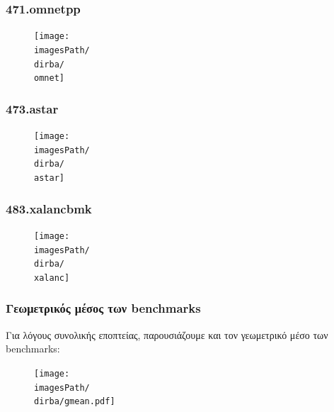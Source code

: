 \documentclass[12pt,a4paper]{article}
\newcommand{\imagesPath}{/home/nick/arch-ntua/ex02/graphs}
\newcommand{\omnet}{471.omnetpp.cslab_branch_predictors.out.pdf}
\newcommand{\astar}{473.astar.cslab_branch_predictors.out.pdf}
\newcommand{\xalanc}{483.xalancbmk.cslab_branch_predictors.out.pdf}
\newcommand{\dirba}{4.2/i}
\begin{document}
				\subsubsection{471.omnetpp}
					\begin{figure}[H]
						\begin{center}
							 \texttt{[image: \\imagesPath/\\dirba/\\omnet]}
						\end{center}
					\end{figure}

				\subsubsection{473.astar}
					\begin{figure}[H]
						\begin{center}
							 \texttt{[image: \\imagesPath/\\dirba/\\astar]}
						\end{center}
					\end{figure}

				\subsubsection{483.xalancbmk}
					\begin{figure}[H]
						\begin{center}
							 \texttt{[image: \\imagesPath/\\dirba/\\xalanc]}
						\end{center}
					\end{figure} 
				
				
				\subsubsection{Γεωμετρικός μέσος των benchmarks}
				
					Για λόγους συνολικής εποπτείας, παρουσιάζουμε και τον γεωμετρικό μέσο των benchmarks:
				
					\begin{figure}[H]
						\begin{center}
							\texttt{[image: \\imagesPath/\\dirba/gmean.pdf]}
						\end{center}
					\end{figure}
			
\end{document}
